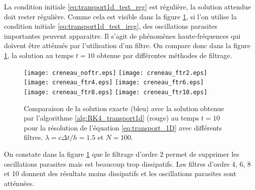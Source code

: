 La condition initiale \eqref{eq:transport1d_test_reg} est régulière, la solution attendue doit rester régulière. Comme cela est visible dans la figure \ref{fig:comp_ireg}, si l'on utilise la condition initiale \eqref{eq:transport1d_test_ireg}, des oscillations parasites importantes peuvent apparaitre. Il s'agit de phénomènes haute-fréquences qui doivent être atténués par l'utilisation d'un filtre. On compare donc dans la figure \ref{fig:comp_ireg}, la solution au temps $t=10$ obtenue par différentes méthodes de filtrage.
\begin{figure}[htbp]
\begin{center}
\texttt{[image: creneau\_noftr.eps]}
\texttt{[image: creneau\_ftr2.eps]}\\
\texttt{[image: creneau\_ftr4.eps]}
\texttt{[image: creneau\_ftr6.eps]}\\
\texttt{[image: creneau\_ftr8.eps]}
\texttt{[image: creneau\_ftr10.eps]}\\
\end{center}
\caption{Comparaison de la solution exacte (bleu) avec la solution obtenue par l'algorithme \ref{alg:RK4_transport1d} (rouge) au temps $t=10$ pour la résolution de l'équation \eqref{eq:transport_1D} avec différents filtres. $\lambda = c \Delta t / h = 1.5$ et $N=100$.}
\label{fig:comp_ireg}
\end{figure}
On constate dans la figure \ref{fig:comp_ireg} que le filtrage d'ordre 2 permet de supprimer les oscillations parasites mais est beaucoup trop dissipatifs. Les filtres d'ordre 4, 6, 8 et 10 donnent des résultats moins dissipatifs et les oscillations parasites sont atténuées.
















































